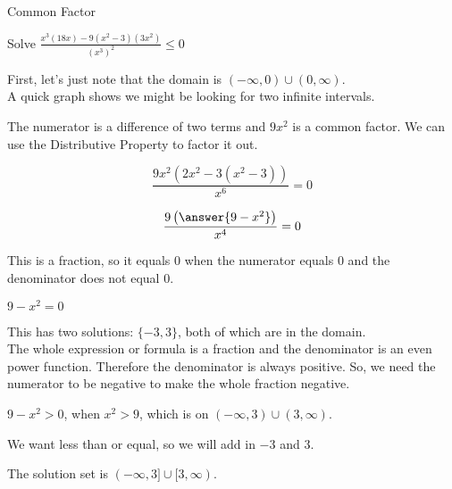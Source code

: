 \documentclass{ximera}
\begin{document}
\begin{example}  Common Factor


Solve $\frac{x^3 (18x) - 9(x^2-3)(3x^2)}{(x^3)^2} \leq 0$



\begin{explanation}

First, let's just note that the domain is $(-\infty, 0) \cup (0, \infty)$. \\

A quick graph shows we might be looking for two infinite intervals.



\begin{center}
\end{center}







The numerator is a difference of two terms and $9 x^2$ is a common factor.  We can use the Distributive Property to factor it out.



\[ \frac{9x^2 (2x^2 - 3(x^2-3))}{x^6} = 0 \]


\[ \frac{9 \left( \answer{9 - x^2} \right)}{x^4} = 0 \]



This is a fraction, so it equals $0$ when the numerator equals $0$ and the denominator does not equal $0$.


$9 - x^2 = 0$

This has two solutions: $\{ -3, 3  \}$, both of which are in the domain. \\


The whole expression or formula is a fraction and the denominator is an even power function. Therefore the denominator is always positive. So, we need the numerator to be negative to make the whole fraction negative.


$9 - x^2 > 0$, when $x^2 > 9$, which is on $(-\infty, 3) \cup (3, \infty)$.

We want less than or equal, so we will add in $-3$ and $3$.


The solution set is $(-\infty, 3] \cup [3, \infty)$.


\end{explanation}
\end{example}
\end{document}
